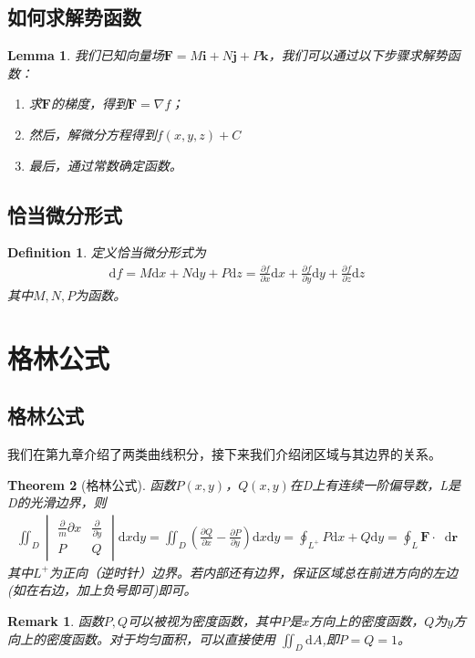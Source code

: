 \documentclass[12pt,a4paper,UTF8]{ctexbook}
\theoremstyle{plain}
\newtheorem{theorem}{\indent Theorem}[section]
\newtheorem{lemma}[theorem]{\indent Lemma}
\newtheorem{definition}{\indent Definition}[section]
\newtheorem{remark}{\indent Remark}[section]
\newcommand{\diff}{\mathop{}\!\mathrm{d}} %
\newcommand{\vb}[1]{\mathbf{#1}}          %
\begin{document}
\subsection{如何求解势函数} 
\begin{lemma} 
    我们已知向量场$\vb{F} = M \vb{i} + N \vb{j} + P \vb{k}$，我们可以通过以下步骤求解势函数：
    \begin{enumerate} 
        \item 求$\vb{F}$的梯度，得到$\vb{F} = \nabla f$；
        \item 然后，解微分方程得到$f(x,y,z)+C$
        \item 最后，通过常数确定函数。
    \end{enumerate}
\end{lemma}
\subsection{恰当微分形式} 
\begin{definition}
    定义恰当微分形式为
    \begin{align*} 
        \mathrm d f = M\mathrm d x + N\mathrm d y + P\mathrm d z = \frac{\partial f}{\partial x}\mathrm dx + \frac{\partial f}{\partial y}\mathrm dy + \frac{\partial f}{\partial z}\mathrm dz
    \end{align*}
    其中$M,N,P$为函数。
\end{definition}
\section{格林公式}
\subsection{格林公式}
我们在第九章介绍了两类曲线积分，接下来我们介绍闭区域与其边界的关系。
\begin{theorem}[格林公式]
函数$P(x,y)$，$Q(x,y)$在D上有连续一阶偏导数，L是D的光滑边界，则
\begin{align*}
    \iint_{D}\begin{vmatrix}\frac{\partial }m{\partial x}&\frac{\partial }{\partial y}\\P&Q\end{vmatrix}\mathrm d{x}\mathrm{d}y=\iint_{D}(\frac{\partial Q}{\partial x}-\frac{\partial P}{\partial y})\mathrm d{x}\mathrm{d}y=\oint_{L^{+}} P\mathrm d x+Q\mathrm d y
    =\oint_{L}\vb{F}\cdot \diff \vb{r}
\end{align*}
其中$L^{+}$为正向（逆时针）边界。若内部还有边界，保证区域总在前进方向的左边(如在右边，加上负号即可)即可。
\end{theorem}
\begin{remark}
函数$P,Q$可以被视为密度函数，其中$P$是$x$方向上的密度函数，$Q$为$y$方向上的密度函数。对于均匀面积，可以直接使用
$\iint_D \mathrm d A$,即$P=Q=1$。
\end{remark}
\end{document}
